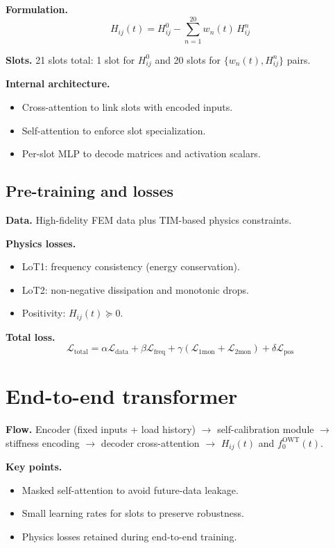 \documentclass[11pt]{article}
\begin{document}
\textbf{Formulation.}
\begin{equation}
H_{ij}(t) = H_{ij}^0 - \sum_{n=1}^{20} w_n(t)\,H_{ij}^n
\end{equation}

\textbf{Slots.} 21 slots total: 1 slot for $H_{ij}^0$ and 20 slots for
$\{w_n(t), H_{ij}^n\}$ pairs.

\textbf{Internal architecture.}
\begin{itemize}
  \item Cross-attention to link slots with encoded inputs.
  \item Self-attention to enforce slot specialization.
  \item Per-slot MLP to decode matrices and activation scalars.
\end{itemize}

\subsection{Pre-training and losses}
\textbf{Data.} High-fidelity FEM data plus TIM-based physics constraints.

\textbf{Physics losses.}
\begin{itemize}
  \item LoT1: frequency consistency (energy conservation).
  \item LoT2: non-negative dissipation and monotonic drops.
  \item Positivity: $H_{ij}(t) \succeq 0$.
\end{itemize}

\textbf{Total loss.}
\begin{equation}
\mathcal{L}_{\mathrm{total}} = \alpha\mathcal{L}_{\mathrm{data}} + \beta\mathcal{L}_{\mathrm{freq}} +
\gamma(\mathcal{L}_{1\mathrm{mon}} + \mathcal{L}_{2\mathrm{mon}}) + \delta\mathcal{L}_{\mathrm{pos}}
\end{equation}

\section{End-to-end transformer}
\textbf{Flow.} Encoder (fixed inputs + load history) $\rightarrow$ self-calibration
module $\rightarrow$ stiffness encoding $\rightarrow$ decoder cross-attention
$\rightarrow$ $H_{ij}(t)$ and $f_0^{\mathrm{OWT}}(t)$.

\textbf{Key points.}
\begin{itemize}
  \item Masked self-attention to avoid future-data leakage.
  \item Small learning rates for slots to preserve robustness.
  \item Physics losses retained during end-to-end training.
\end{itemize}
\end{document}
